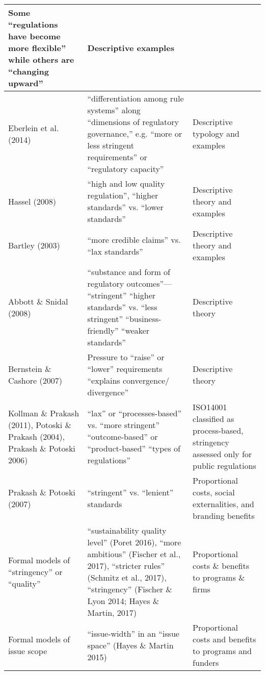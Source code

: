 \begin{table}
\begin{tabular}{p{3.8cm}p{7.5cm}p{5cm}}
Some “regulations have become more flexible” while others are “changing upward”&
Descriptive examples\\
\hline
Eberlein et al. (2014)&
“differentiation among rule systems” along “dimensions of regulatory governance,” e.g. “more or less stringent requirements” or “regulatory capacity”&
Descriptive typology and examples\\
\hline
Hassel (2008)&
“high and low quality regulation”, “higher standards” vs. “lower standards”&
Descriptive theory and examples\\
\hline
Bartley (2003)&
“more credible claims” vs. “lax standards” &
Descriptive theory and examples\\
\hline
Abbott \& Snidal (2008)&
“substance and form of regulatory outcomes”—
 “stringent” “higher standards” vs. “less stringent” “business-friendly” “weaker standards”&
Descriptive theory\\
\hline
Bernstein \& Cashore (2007)&
Pressure to “raise” or “lower” requirements “explains convergence/ divergence”&
Descriptive theory\\
\hline
Kollman \& Prakash (2011), Potoski \& Prakash (2004), Prakash \& Potoski 2006)&
“lax” or “processes-based” vs. “more stringent” “outcome-based” or “product-based” “types of regulations”&
ISO14001 classified as process-based, stringency assessed only for public regulations\\
\hline
Prakash \& Potoski (2007)&
“stringent” vs. “lenient” standards&
Proportional costs, social externalities, and branding benefits\\
\hline
Formal models of “stringency” or “quality”&
“sustainability quality level” (Poret 2016), “more ambitious” (Fischer et al., 2017), “stricter rules” (Schmitz et al., 2017), “stringency” (Fischer \& Lyon 2014; Hayes \& Martin, 2017)&
Proportional costs \& benefits to programs \& firms\\
\hline
Formal models of issue scope&
“issue-width” in an “issue space” (Hayes \& Martin 2015)&
Proportional costs and benefits to programs and funders
\end{tabular}

\end{table}
